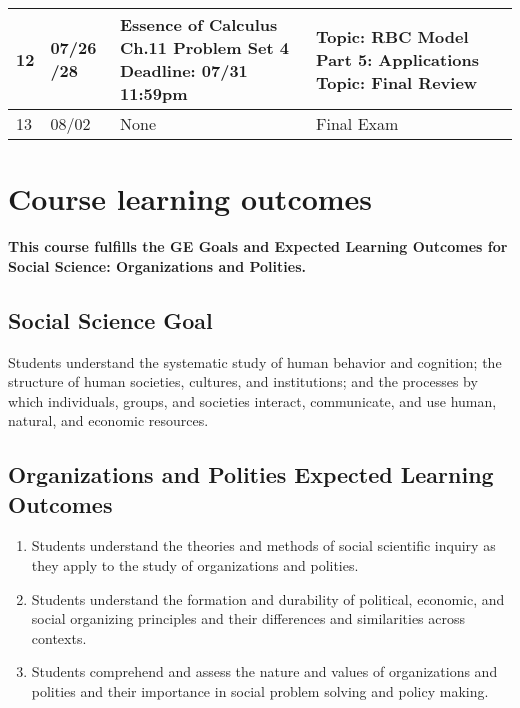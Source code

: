 \documentclass[12pt]{article}
\begin{document}
\begin{tabular}{|p{\bb}|p{\qq}|p{\rr}|p{\pp}|}
        12
        &
        07/26
        \newline
        07/28
        &
        Essence of Calculus Ch.11
        \newline
        Problem Set 4
        \newline
        Deadline: 07/31 11:59pm
        &
        Topic: RBC Model Part 5: Applications
        \newline
        Topic: Final Review
    \\
    \hline
        13
        &
        08/02
        &
        None
        &
        Final Exam
    \\
    \hline
\end{tabular}



\newpage

\section*{Course learning outcomes}

\textbf{This course fulfills the GE Goals and Expected Learning Outcomes for Social Science: Organizations and Polities.}

\subsection*{Social Science Goal}

Students understand the systematic study of human behavior and cognition; the structure of human societies, cultures, and institutions; and the processes by which individuals, groups, and societies interact, communicate, and use human, natural, and economic resources.

\subsection*{Organizations and Polities Expected Learning Outcomes}
\begin{enumerate}
    \item Students understand the theories and methods of social scientific inquiry as they apply to the study of organizations and polities.
    \item Students understand the formation and durability of political, economic, and social organizing principles and their differences and similarities across contexts.
    \item Students comprehend and assess the nature and values of organizations and polities and their importance in social problem solving and policy making.
\end{enumerate}
\end{document}
